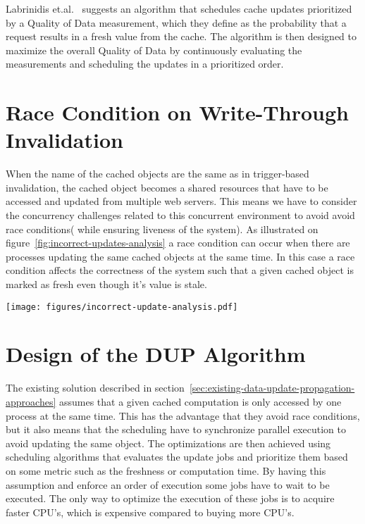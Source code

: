 Labrinidis et.al.~\cite{paper:update-propagation-strategies} suggests an algorithm that schedules cache updates prioritized by a Quality of Data measurement, which they define as the probability that a request results in a fresh value from the cache. The algorithm is then designed to maximize the overall Quality of Data by continuously evaluating the measurements and scheduling the updates in a prioritized order.


\section{Race Condition on Write-Through Invalidation}
\label{sec:race-condition-on-write-through-invalidation}

When the name of the cached objects are the same as in trigger-based invalidation, the cached object becomes a shared resources that have to be accessed and updated from multiple web servers. This means we have to consider the concurrency challenges related to this concurrent environment to avoid avoid race conditions( while ensuring liveness of the system).
As illustrated on figure~\ref{fig:incorrect-updates-analysis} a race condition can occur when there are processes updating the same cached objects at the same time. In this case a race condition affects the correctness of the system such that a given cached object is marked as fresh even though it's value is stale.

\begin{figure*}[ht!]
  \centering
  \texttt{[image: figures/incorrect-update-analysis.pdf]}
  \caption{Showing how two concurrent caching updates from two different application servers results in an inconsistent state. We see that even though the request from \emph{Update Process 2} are based on data older than \emph{Update Process 1} it gets to write }
  \label{fig:incorrect-updates-analysis}
\end{figure*}


\section{Design of the DUP Algorithm}
\label{sec:the-data-update-propagation-algorithm}

The existing solution described in section~\ref{sec:existing-data-update-propagation-approaches} assumes that a given cached computation is only accessed by one process at the same time. This has the advantage that they avoid race conditions, but it also means that the scheduling have to synchronize parallel execution to avoid updating the same object. The optimizations are then achieved using scheduling algorithms that evaluates the update jobs and prioritize them based on some metric such as the freshness or computation time. By having this assumption and enforce an order of execution some jobs have to wait to be executed. The only way to optimize the execution of these jobs is to acquire faster CPU's, which is expensive compared to buying more CPU's.

